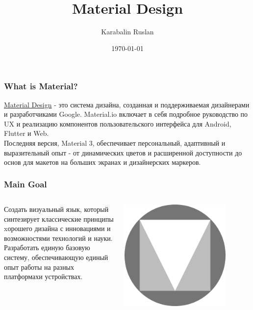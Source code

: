 \documentclass[12pt]{beamer}
\title{Material Design}
\author{Karabalin Ruslan}
\date{\today}
\begin{document}
	
	\begin{frame}
		\titlepage
	\end{frame}
	
	\begin{frame}
		\frametitle{What is Material?}
		
		\href{https://m3.material.io/}{Material Design} - это система дизайна,
        созданная и поддерживаемая дизайнерами и разработчиками Google.
        Material.io включает в себя подробное руководство по UX
        и реализацию компонентов пользовательского интерфейса
        для Android, Flutter и Web. \\
		
		Последняя версия, Material 3,
        обеспечивает персональный, адаптивный
        и выразительный опыт - от динамических цветов
        и расширенной доступности до основ
        для макетов на больших экранах и дизайнерских маркеров.
		
	\end{frame}
	
	\begin{frame}
		\frametitle{Main Goal}

        \begin{columns}
            \begin{column}{0.5\textwidth}
                Создать визуальный язык,
                который синтезирует классические принципы
                xорошего дизайна с инновациями
                и возможностями технологий и науки. \\

                Разработать единую базовую систему,
                обеспечивающую единый опыт работы
                на разных платформахи устройствах.
            \end{column}
            
            \begin{column}{0.5\textwidth}
                \includegraphics[width=0.8\textwidth]{md-logo.png}
            \end{column}

        \end{columns}

	\end{frame}
	
\end{document}
